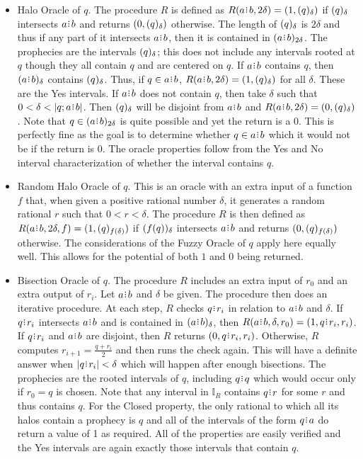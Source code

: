 \documentclass[12pt]{article}
\begin{document}
\begin{itemize}
    \item Halo Oracle of $q$. The procedure $R$ is defined as $R(a\rint b, 2\delta) = (1, \halo{q})$ if $\halo{q}$ intersects $a\rint b$ and returns $(0, \halo{q})$ otherwise. The length of $\halo{q}$ is $2\delta$ and thus if any part of it intersects $a \rint b$, then it is contained in $\halo[2\delta]{a \rint b}$. The prophecies are the intervals $\halo{q}$; this does not include any intervals rooted at $q$ though they all contain $q$ and are centered on $q$. If $a \rint b$ contains $q$, then $\halo{a \rint b}$ contains $\halo{q}$. Thus, if $q \in a \rint b$, $R(a \rint b, 2\delta) = (1, \halo{q})$ for all $\delta$. These are the Yes intervals. If $a \rint b$ does not contain $q$, then take $\delta$ such that $0 < \delta < |q; a \rint b|$. Then $\halo{q}$ will be disjoint from $a \rint b$ and $R(a \rint b, 2\delta) = (0, \halo{q})$. Note that $q \in \halo[2\delta]{a \rint b}$ is quite possible and yet the return is a $0$. This is perfectly fine as the goal is to determine whether $q \in a \rint b$ which it would not be if the return is 0. The oracle properties follow from the Yes and No interval characterization of whether the interval contains $q$. 
    
    \item Random Halo Oracle of $q$. This is an oracle with an extra input of a function $f$ that, when given a positive rational number $\delta$, it generates a random rational $r$ such that $0 < r < \delta$. The procedure $R$ is then defined as $R(a\rint b, 2\delta, f) = (1, \halo[f(\delta)]{q})$ if $\halo{f(q)}$ intersects $a\rint b$ and returns $(0, \halo[f(\delta)]{q})$ otherwise. The considerations of the Fuzzy Oracle of $q$ apply here equally well. This allows for the potential of both $1$ and $0$ being returned. 
    
    \item Bisection Oracle of $q$. The procedure $R$ includes an extra input of $r_0$ and an extra output of $r_i$. Let $a \rint b$ and $\delta$ be given. The procedure then does an iterative procedure.  At each step, $R$ checks $q \rint r_i$ in relation to $a \rint b$ and $\delta$. If $q \rint r_i$ intersects $a \rint b$ and is contained in $\halo{a \rint b}$, then $R(a \rint b, \delta, r_0) = (1, q \rint r_i, r_i)$. If $q \rint r_i$ and $a \rint b$ are disjoint, then $R$ returns $(0, q \rint r_i, r_i)$. Otherwise, $R$ computes $r_{i+1} = \frac{q + r_i}{2}$ and then runs the check again. This will have a definite answer when $|q \rint r_i| < \delta$ which will happen after enough bisections. The prophecies are the rooted intervals of $q$, including $q \rint q$ which would occur only if $r_0 = q$ is chosen. Note that any interval in $\mathbb{I}_R$ contains $q \rint r$ for some $r$ and thus contains $q$. For the Closed property, the only rational to which all its halos contain a prophecy is $q$ and all of the intervals of the form $q \rint a$ do return a value of 1 as required. All of the properties are easily verified and the Yes intervals are again exactly those intervals that contain $q$.
\end{itemize}
\end{document}
